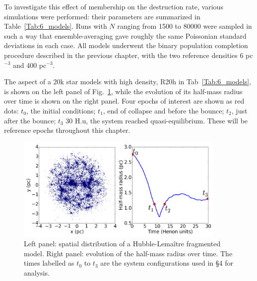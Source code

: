To investigate this effect of membership on the destruction rate, various simulations were performed: their parameters are summarized in Table~\ref{Tab:6_models}. Runs with $N$ ranging from 1500 to 80000 were sampled in such a way that ensemble-averaging  gave roughly the same Poissonian standard deviations in each case. All models underwent the binary population completion procedure described in the previous chapter, with the two reference densities 6 pc$^{-3}$ and 400 pc$^{-3}$.

The aspect of a 20k star models with high density, R20h in Tab~\ref{Tab:6_models}, is shown on the left panel of Fig.~\ref{Fig:6_Rhm}, while the evolution of its half-mass radius over time is shown on the right panel. Four epochs of interest are shown as red dots: $t_0$, the initial conditions; $t_1$, end of collapse and before the bounce; $t_2$, just after the bounce; $t_3$ 30 H.u, the system reached quasi-equilibrium. These will be reference epochs throughout this chapter.


\begin{figure}
\begin{center}
\includegraphics[width=0.9\textwidth]{Figures/6_Rhm}
\caption{Left panel: spatial distribution of a Hubble-Lema\^itre fragmented model. Right panel: evolution of the half-mass radius over time. The times labelled as $t_0$ to $t_3$ are the system configurations used in \S4 for analysis. }
\label{Fig:6_Rhm}
\end{center}
\end{figure}


%

